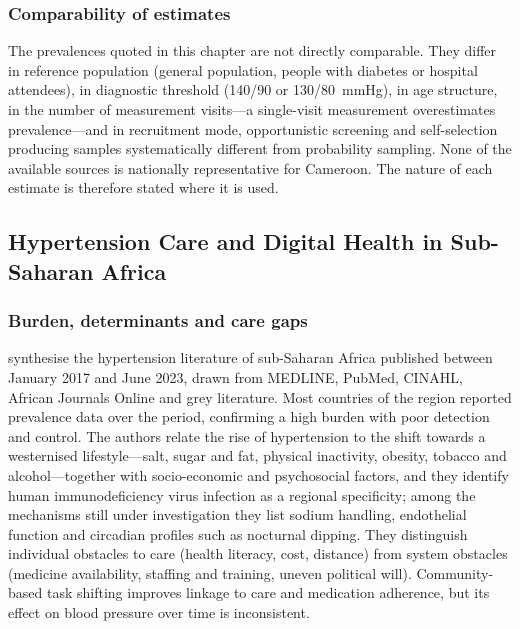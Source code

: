 \subsubsection{Comparability of estimates}\label{sec:comparability}

The prevalences quoted in this chapter are not directly comparable. They differ in reference population (general population, people with diabetes or hospital attendees), in diagnostic threshold (140/90 or 130/80~mmHg), in age structure, in the number of measurement visits---a single-visit measurement overestimates prevalence---and in recruitment mode, opportunistic screening and self-selection producing samples systematically different from probability sampling. None of the available sources is nationally representative for Cameroon. The nature of each estimate is therefore stated where it is used.

\subsection{Hypertension Care and Digital Health in Sub-Saharan Africa}\label{sec:lr-regional}\label{sec:diagnosis}

\subsubsection{Burden, determinants and care gaps}

\Textcite{gafane2024} synthesise the hypertension literature of sub-Saharan Africa published between January 2017 and June 2023, drawn from MEDLINE, PubMed, CINAHL, African Journals Online and grey literature. Most countries of the region reported prevalence data over the period, confirming a high burden with poor detection and control. The authors relate the rise of hypertension to the shift towards a westernised lifestyle---salt, sugar and fat, physical inactivity, obesity, tobacco and alcohol---together with socio-economic and psychosocial factors, and they identify human immunodeficiency virus infection as a regional specificity; among the mechanisms still under investigation they list sodium handling, endothelial function and circadian profiles such as nocturnal dipping. They distinguish individual obstacles to care (health literacy, cost, distance) from system obstacles (medicine availability, staffing and training, uneven political will). Community-based task shifting improves linkage to care and medication adherence, but its effect on blood pressure over time is inconsistent.

